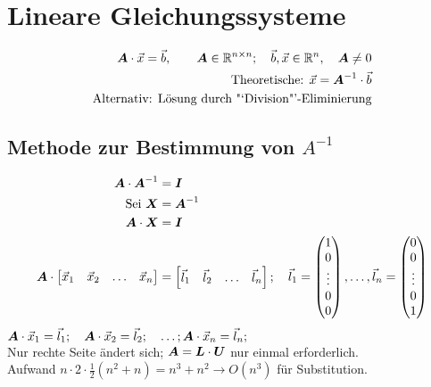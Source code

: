 \chapter{Lineare Gleichungssysteme}
\begin{align}
	\boldsymbol {A} \cdot \vec{x} = \vec{b}, \qquad \boldsymbol {A} \in \mathbb{R}^{n\times n}; \quad \vec{b}, \vec{x} \in \mathbb{R}^n, \quad \boldsymbol {A} \neq 0\\
	\text{Theoretische: } \vec{x} = \boldsymbol {A}^{-1} \cdot \vec{b}\\
	\text{Alternativ: Lösung durch "`Division"'-Eliminierung}
\end{align}

\section{Methode zur Bestimmung von $A^{-1}$}
\begin{align}
	\boldsymbol {A}\cdot\boldsymbol {A}^{-1} &= \boldsymbol {I}\\
	\text{Sei }\boldsymbol {X} &= \boldsymbol {A}^{-1}\\
	\boldsymbol {A}\cdot\boldsymbol {X} &= \boldsymbol {I}\\
	\boldsymbol {A}\cdot\begin{bmatrix}
	\vec{x}_1 & \vec{x}_2 & \ldots & \vec{x}_n
	\end{bmatrix} &= \begin{bmatrix}
	\vec{l}_1 & \vec{l}_2 & \ldots & \vec{l}_n
	\end{bmatrix};\quad\vec{l}_1 = \begin{pmatrix}
	1\\ 0\\ \vdots\\ 0\\ 0
	\end{pmatrix}, \ldots, \vec{l}_n = \begin{pmatrix}
	0\\ 0\\ \vdots\\ 0\\ 1
	\end{pmatrix}
\end{align}
$\boldsymbol {A}\cdot\vec{x}_1 = \vec{l}_1;\quad\boldsymbol {A}\cdot\vec{x}_2 = \vec{l}_2;\quad\ldots;\boldsymbol {A}\cdot\vec{x}_n = \vec{l}_n;$\\
Nur rechte Seite ändert sich; $\boldsymbol {A} = \boldsymbol {L}\cdot\boldsymbol {U}$ nur einmal erforderlich.\\
Aufwand $n\cdot 2\cdot\frac{1}{2}(n^2 + n) = n^3 + n^2 \rightarrow O(n^3)$ für Substitution.

